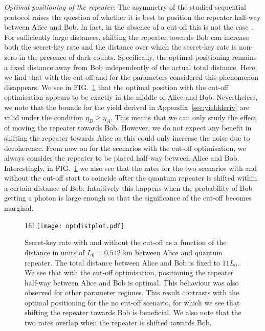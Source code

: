 \documentclass[aps,pra,reprint,superscriptaddress]{revtex4-1}
\makeatletter
\newcommand*{\centerfloat}{%
  \parindent \z@
  \leftskip \z@ \@plus 1fil \@minus \textwidth
  \rightskip\leftskip
  \parfillskip \z@skip}
\makeatother
\begin{document}
\smallskip
\textit{Optimal positioning of the repeater.} The asymmetry of the studied sequential protocol raises the question of whether it is best to position the repeater half-way between Alice and Bob. In fact, in the absence of a cut-off this is not the case~\cite{luong2015overcoming}. For sufficiently large distances, shifting the repeater towards Bob can increase both the secret-key rate and the distance over which the secret-key rate is non-zero in the presence of dark counts. Specifically, 
the optimal positioning remains a fixed distance away from Bob independently of the actual total distance. 
Here, we find that with the cut-off and for the parameters considered this phenomenon disappears. We see in FIG.~\ref{fig:optposition} that the optimal position with the cut-off optimisation appears to be exactly in the middle of Alice and Bob. Nevertheless, we note that the bounds for the yield derived in Appendix~\ref{sec:yieldderiv} are valid under the condition $\eta_B \ge \eta_A$. This means that we can only study the effect of moving the repeater towards Bob. However, we do not expect any benefit in shifting the repeater towards Alice as this could only increase the noise due to decoherence. From now on for the scenarios with the cut-off optimisation, we always consider the repeater to be placed half-way between Alice and Bob. Interestingly, in FIG.~\ref{fig:optposition} we also see that the rates for the two scenarios with and without the cut-off start to coincide after the quantum repeater is shifted within a certain distance of Bob. Intuitively this happens when the probability of Bob getting a photon is large enough so that the significance of the cut-off becomes marginal.


\begin{figure}
\centerfloat
\texttt{[image: optdistplot.pdf]}
\caption{Secret-key rate with and without the cut-off as a function of the distance in units of $L_0= 0.542 \text{ km}$ between Alice and quantum repeater. The total distance between Alice and Bob is fixed to $11L_0$. We see that with the cut-off optimisation, positioning the repeater half-way between Alice and Bob is optimal. This behaviour was also observed for other parameter regimes. This result contrasts with the optimal positioning for the no cut-off scenario, for which we see that shifting the repeater towards Bob is beneficial. We also note that the two rates overlap when the repeater is shifted towards Bob.}
\label{fig:optposition}
\end{figure}
\end{document}
